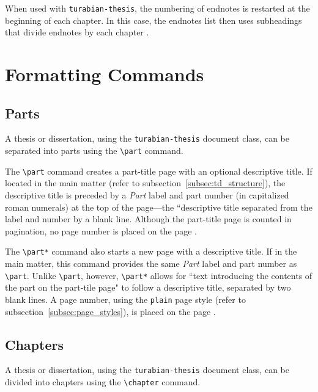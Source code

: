\documentclass{article}
\newcommand{\textcmd}[1]{\texttt{\textbackslash #1}}
\begin{document}
When used with \texttt{turabian-thesis}, the numbering of endnotes is restarted at the beginning of each chapter. In this case, the endnotes list then uses subheadings that divide endnotes by each chapter \autocite[157]{turabian_manual_2013}.


\clearpage
\section{Formatting Commands}
\label{sec:formatting_commands}


\subsection{Parts}
\label{subsec:parts}

A thesis or dissertation, using the \texttt{turabian-thesis} document class, can be separated into parts using the \textcmd{part} command. 

The \textcmd{part} command creates a part-title page with an optional descriptive title. If located in the main matter (refer to subsection~\ref{subsec:td_structure}), the descriptive title is preceded by a \emph{Part} label and part number (in capitalized roman numerals) at the top of the page---the ``descriptive title separated from the label and number by a blank line. Although the part-title page is counted in pagination, no page number is placed on the page \autocite[390]{turabian_manual_2013}.

The \textcmd{part*} command also starts a new page with a descriptive title. If in the main matter, this command provides the same \emph{Part} label and part number as \textcmd{part}. Unlike \textcmd{part}, however, \textcmd{part*} allows for ``text introducing the contents of the part on the part-tile page" to follow a descriptive title, separated by two blank lines. A page number, using the \texttt{plain} page style (refer to subsection~\ref{subsec:page_styles}), is placed on the page \autocite[390]{turabian_manual_2013}.


\subsection{Chapters}
\label{subsec:chapters}

A thesis or dissertation, using the \texttt{turabian-thesis} document class, can be divided into chapters using the \textcmd{chapter} command.
\end{document}
